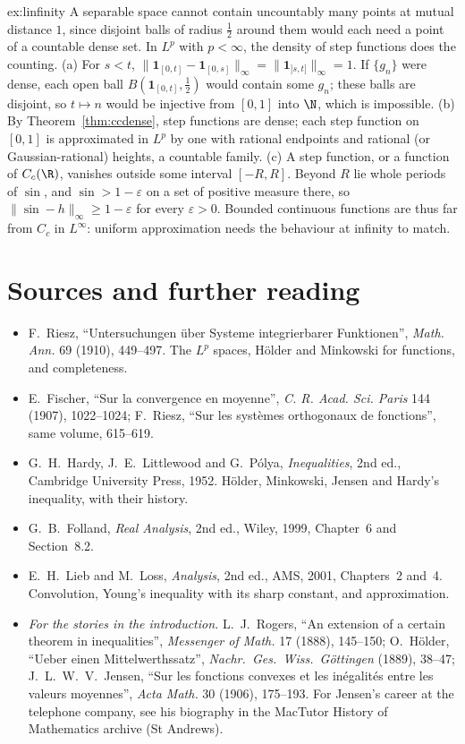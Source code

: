 \begin{solution}{ex:linfinity}
\idea A separable space cannot contain uncountably many points at mutual distance $1$, since disjoint balls of radius $\frac12$ around them would each need a point of a countable dense set. In $L^p$
with $p<\infty$, the density of step functions does the counting.
\writeup (a) For $s<t$, $\|\mathbf 1_{[0,t]}-\mathbf 1_{[0,s]}\|_\infty=\|\mathbf 1_{]s,t]}\|_\infty=1$. If $\{g_n\}$ were dense, each open ball $B(\mathbf 1_{[0,t]},\frac12)$ would contain some $g_n$; these balls are disjoint, so $t\mapsto n$ would
be injective from $[0,1]$ into $\N$, which is impossible. (b) By Theorem~\ref{thm:ccdense}, step functions are dense; each step function on $[0,1]$ is approximated in $L^p$ by one with rational endpoints
and rational (or Gaussian-rational) heights, a countable family. (c) A step function, or a function of $C_c(\R)$, vanishes outside some interval $[-R,R]$. Beyond $R$ lie whole periods of $\sin$, and $\sin>1-\varepsilon$ on a set of positive measure there,
so $\|\sin-h\|_\infty\ge1-\varepsilon$ for every $\varepsilon>0$. Bounded continuous functions are thus far from $C_c$ in $L^\infty$: uniform approximation needs the behaviour at infinity to match.
\end{solution}

\section*{Sources and further reading}

\begin{itemize}
\item F.~Riesz, ``Untersuchungen \"uber Systeme integrierbarer Funktionen'', \emph{Math. Ann.} 69 (1910), 449--497. The $L^p$ spaces, H\"older and Minkowski for functions, and completeness.
\item E.~Fischer, ``Sur la convergence en moyenne'', \emph{C. R. Acad. Sci. Paris} 144 (1907), 1022--1024; F.~Riesz, ``Sur les syst\`emes orthogonaux de fonctions'', same volume, 615--619.
\item G.~H.~Hardy, J.~E.~Littlewood and G.~P\'olya, \emph{Inequalities}, 2nd ed., Cambridge University Press, 1952. H\"older, Minkowski, Jensen and Hardy's inequality, with their history.
\item G.~B.~Folland, \emph{Real Analysis}, 2nd ed., Wiley, 1999, Chapter~6 and Section~8.2.
\item E.~H.~Lieb and M.~Loss, \emph{Analysis}, 2nd ed., AMS, 2001, Chapters~2 and~4. Convolution, Young's inequality with its sharp constant, and approximation.
\item \emph{For the stories in the introduction.} L.~J.~Rogers, ``An extension of a certain theorem in inequalities'', \emph{Messenger of Math.} 17 (1888), 145--150; O.~H\"older,
``Ueber einen Mittelwerthssatz'', \emph{Nachr.\ Ges.\ Wiss.\ G\"ottingen} (1889), 38--47; J.~L.~W.~V.~Jensen, ``Sur les fonctions convexes et les in\'egalit\'es entre les valeurs
moyennes'', \emph{Acta Math.} 30 (1906), 175--193. For Jensen's career at the telephone company, see his biography in the MacTutor History of Mathematics archive
(St Andrews).
\end{itemize}

